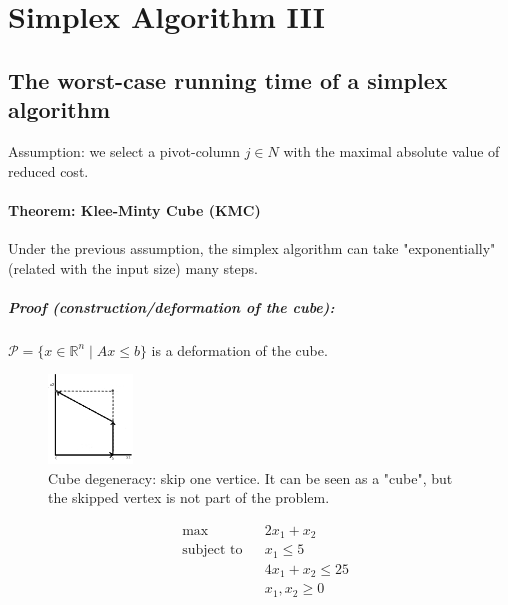 \documentclass[main]{subfiles}
\begin{document}

\section{Simplex Algorithm III}

\subsection{The worst-case running time of a simplex algorithm}
Assumption: we select a pivot-column $j \in N$ with the maximal absolute value
of reduced cost.

\paragraph{Theorem: Klee-Minty Cube (KMC)} Under the previous assumption, the
simplex algorithm can take "exponentially" (related with the input size) many
steps.

\subparagraph{Proof (construction/deformation of the cube): }

$\mathcal{P} = \{x \in \mathbb{R}^n \mid Ax \leq b \}$ is a deformation of the
cube.

\begin{figure}[!h]
  \label{fig:projection}
  \caption{Cube degeneracy: skip one vertice. It can be seen as a "cube", but
  the skipped vertex is not part of the problem.}
  \centering
    \includegraphics[width=0.2\textwidth]{imgs/kmc.png}
\end{figure}

\begin{equation*}
\begin{aligned}
& \max
& & 2x_1 + x_2 \\
& \text{subject to}
& & x_{1} \leq 5 \\
&&& 4x_1 + x_2 \leq 25\\
&&& x_1, x_2 \geq 0
\end{aligned}
\end{equation*}
\end{document}
